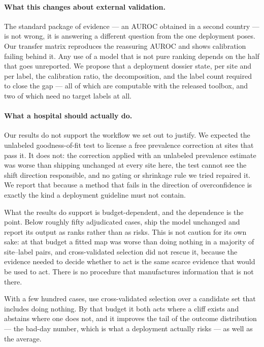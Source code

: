\paragraph{What this changes about external validation.}
The standard package of evidence --- an AUROC obtained in a second country ---
is not wrong, it is answering a different question from the one deployment
poses.  Our transfer matrix reproduces the reassuring AUROC and shows
calibration failing behind it.  Any use of a model that is not pure ranking
depends on the half that goes unreported.  We propose that a deployment dossier
state, per site and per label, the calibration ratio, the decomposition, and the
label count required to close the gap --- all of which are computable with the
released toolbox, and two of which need no target labels at all.

\paragraph{What a hospital should actually do.}
Our results do not support the workflow we set out to justify.  We expected the
unlabeled goodness-of-fit test to license a free prevalence correction at sites
that pass it.  It does not: the correction applied with an unlabeled prevalence
estimate was worse than shipping unchanged at every site here, the test cannot
see the shift direction responsible, and no gating or shrinkage rule we tried
repaired it.  We report that because a method that fails in the direction of
overconfidence is exactly the kind a deployment guideline must not contain.

What the results do support is budget-dependent, and the dependence is the
point.  Below roughly fifty adjudicated cases, ship the model unchanged and
report its output as ranks rather than as risks.  This is not caution for its
own sake: at that budget a fitted map was worse than doing nothing in a majority
of site--label pairs, and cross-validated selection did not rescue it, because
the evidence needed to decide whether to act is the same scarce evidence that
would be used to act.  There is no procedure that manufactures information that
is not there.

With a few hundred cases, use cross-validated selection over a candidate set
that includes doing nothing.  By that budget it both acts where a cliff exists
and abstains where one does not, and it improves the tail of the outcome
distribution --- the bad-day number, which is what a deployment actually risks
--- as well as the average.

